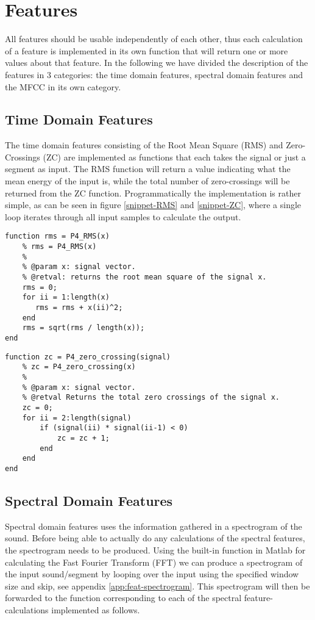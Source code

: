 \section{Features}
All features should be usable independently of each other, thus each calculation of a feature is implemented in its own function that will return one or more values about that feature. In the following we have divided the description of the features in 3 categories: the time domain features, spectral domain features and the MFCC in its own category.

\subsection{Time Domain Features}
The time domain features consisting of the Root Mean Square (RMS) and Zero-Crossings (ZC) are implemented as functions that each takes the signal or just a segment as input. The RMS function will return a value indicating what the mean energy of the input is, while the total number of zero-crossings will be returned from the ZC function. Programmatically the implementation is rather simple, as can be seen in figure \ref{snippet-RMS} and \ref{snippet-ZC}, where a single loop iterates through all input samples to calculate the output.

\begin{lstlisting}[caption=Matlab implementation of the RMS algorithm., label=snippet-RMS]
function rms = P4_RMS(x)
    % rms = P4_RMS(x)
    %
    % @param x: signal vector.
    % @retval: returns the root mean square of the signal x.
    rms = 0;
    for ii = 1:length(x)
       rms = rms + x(ii)^2; 
    end
    rms = sqrt(rms / length(x));
end
\end{lstlisting}

\begin{lstlisting}[caption=Matlab implementation of the ZC algorithm., label=snippet-ZC]
function zc = P4_zero_crossing(signal)
    % zc = P4_zero_crossing(x)
    %
    % @param x: signal vector.
    % @retval Returns the total zero crossings of the signal x.
    zc = 0;
    for ii = 2:length(signal)
        if (signal(ii) * signal(ii-1) < 0)
            zc = zc + 1;
        end
    end
end
\end{lstlisting}

\subsection{Spectral Domain Features}
Spectral domain features uses the information gathered in a spectrogram of the sound. Before being able to actually do any calculations of the spectral features, the spectrogram needs to be produced. Using the built-in function in Matlab for calculating the Fast Fourier Transform (FFT) we can produce a spectrogram of the input sound/segment by looping over the input using the specified window size and skip, see appendix \ref{app:feat-spectrogram}. This spectrogram will then be forwarded to the function corresponding to each of the spectral feature-calculations implemented as follows.

